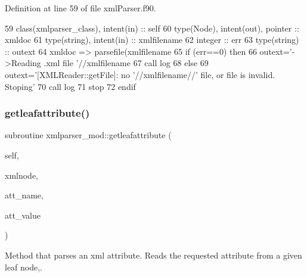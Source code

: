Definition at line 59 of file xml\+Parser.\+f90.


\begin{DoxyCode}
59     \textcolor{keywordtype}{class}(xmlparser\_class), \textcolor{keywordtype}{intent(in)} :: self
60     \textcolor{keywordtype}{type}(Node), \textcolor{keywordtype}{intent(out)}, \textcolor{keywordtype}{pointer} :: xmldoc
61     \textcolor{keywordtype}{type}(string), \textcolor{keywordtype}{intent(in)} :: xmlfilename
62     \textcolor{keywordtype}{integer} :: err
63     \textcolor{keywordtype}{type}(string) :: outext
64     xmldoc => parsefile(xmlfilename%
65     \textcolor{keywordflow}{if} (err==0) \textcolor{keywordflow}{then}
66         outext=\textcolor{stringliteral}{'->Reading .xml file '}//xmlfilename
67         \textcolor{keyword}{call }log%
68     \textcolor{keywordflow}{else}
69         outext=\textcolor{stringliteral}{'[XMLReader::getFile]: no '}//xmlfilename//\textcolor{stringliteral}{' file, or file is invalid. Stoping'}
70         \textcolor{keyword}{call }log%
71         stop
72 \textcolor{keywordflow}{    endif}
\end{DoxyCode}
\mbox{\label{namespacexmlparser__mod_a3e977c7792b08b009a09cc1f7fb4f80a}} 
\subsubsection{\texorpdfstring{getleafattribute()}{getleafattribute()}}
{\footnotesize\ttfamily subroutine xmlparser\+\_\+mod\+::getleafattribute (\begin{DoxyParamCaption}\item[{class(\mbox{\hyperlink{structxmlparser__mod_1_1xmlparser__class}{xmlparser\+\_\+class}}), intent(in)}]{self,  }\item[{type(node), intent(in), pointer}]{xmlnode,  }\item[{type(string), intent(in)}]{att\+\_\+name,  }\item[{type(string), intent(out)}]{att\+\_\+value }\end{DoxyParamCaption})\hspace{0.3cm}{\ttfamily [private]}}



Method that parses an xml attribute. Reads the requested attribute from a given leaf node,. 

